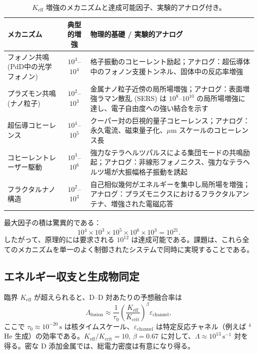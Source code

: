 \documentclass[12pt]{article}
\newcommand{\Keff}{K_{\mathrm{eff}}}
\newcommand{\Kcrit}{K_{\mathrm{crit}}}
\theoremstyle{remark}
\begin{document}
	\begin{table}[htbp]
		\centering
		\caption{\(\Keff\) 増強のメカニズムと達成可能因子、実験的アナログ付き。}
		\label{tab:enhancement}
		\small
		\begin{tabularx}{\textwidth}{>{\raggedright\arraybackslash}p{3.2cm} c X}
			\toprule
			\textbf{メカニズム} & \textbf{典型的増強} & \textbf{物理的基礎 / 実験的アナログ} \\
			\midrule
			フォノン共鳴 (PdD中の光学フォノン) & \(10^3\)–\(10^4\) & 格子振動のコヒーレント励起；アナログ：超伝導体中のフォノン支援トンネル、固体中の反応率増強 \cite{Storms2014, Tinkham2004} \\
			プラズモン共鳴 (ナノ粒子) & \(10^2\)–\(10^3\) & 金属ナノ粒子近傍の局所場増強；アナログ：表面増強ラマン散乱 (SERS) は \(10^8\)–\(10^{10}\) の局所場増強に達し、電子自由度への強い結合を示す \cite{Maier2007, SERS} \\
			超伝導コヒーレンス & \(10^4\)–\(10^5\) & クーパー対の巨視的量子コヒーレンス；アナログ：永久電流、磁束量子化、\(\mu\)m スケールのコヒーレンス長 \cite{Tinkham2004} \\
			コヒーレントレーザー駆動 & \(10^3\)–\(10^6\) & 強力なテラヘルツパルスによる集団モードの共鳴励起；アナログ：非線形フォノニクス、強力なテラヘルツ場が大振幅格子振動を誘起 \cite{Kampfrath2011} \\
			フラクタルナノ構造 & \(10^2\)–\(10^3\) & 自己相似幾何がエネルギーを集中し局所場を増強；アナログ：プラズモニクスにおけるフラクタルアンテナ、増強された電磁応答 \cite{Mandelbrot1982, fractal-antenna} \\
			\bottomrule
		\end{tabularx}
	\end{table}
	
	最大因子の積は驚異的である：
	\[
	10^4 \times 10^3 \times 10^5 \times 10^6 \times 10^3 = 10^{21}.
	\]
	したがって、原理的には要求される \(10^{12}\) は達成可能である。課題は、これら全てのメカニズムを単一のよく制御されたシステムで同時に実現することである。
	
	\subsection{エネルギー収支と生成物同定}
	
	臨界 \(\Keff\) が超えられると、D–D 対あたりの予想融合率は
	\begin{equation}
		\Lambda_{\text{fusion}} \approx \frac{1}{\tau_0} \left( \frac{\Keff}{\Kcrit} \right)^{\beta} \varepsilon_{\text{channel}},
		\label{eq:fusion-rate}
	\end{equation}
	ここで \(\tau_0 \approx 10^{-20}\,\text{s}\) は核タイムスケール、\(\varepsilon_{\text{channel}}\) は特定反応チャネル（例えば \(^4\)He 生成）の効率である。\(\Keff/\Kcrit = 10\), \(\beta = 0.67\) に対して、\(\Lambda \approx 10^{13}\,\text{s}^{-1}\) 対を得る。密な D 添加金属では、総電力密度は有意になり得る。
	
\end{document}
